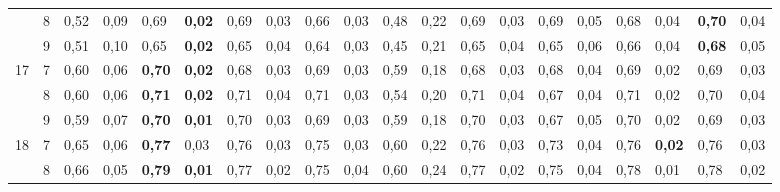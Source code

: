 \documentclass[conference]{IEEEtran}
\begin{document}
\begin{table}[]
\begin{tabular}{|cl|ll|ll|ll|ll|ll|ll|ll|ll|ll|}
		\multicolumn{1}{|c|}{} & 8 & \multicolumn{1}{l|}{0,52} & 0,09 & \multicolumn{1}{l|}{0,69} & \textbf{0,02} & \multicolumn{1}{l|}{0,69} & 0,03 & \multicolumn{1}{l|}{0,66} & 0,03 & \multicolumn{1}{l|}{0,48} & 0,22 & \multicolumn{1}{l|}{0,69} & 0,03 & \multicolumn{1}{l|}{0,69} & 0,05 & \multicolumn{1}{l|}{0,68} & 0,04 & \multicolumn{1}{l|}{\textbf{0,70}} & 0,04 \\ \cline{2-20} 
		\multicolumn{1}{|c|}{} & 9 & \multicolumn{1}{l|}{0,51} & 0,10 & \multicolumn{1}{l|}{0,65} & \textbf{0,02} & \multicolumn{1}{l|}{0,65} & 0,04 & \multicolumn{1}{l|}{0,64} & 0,03 & \multicolumn{1}{l|}{0,45} & 0,21 & \multicolumn{1}{l|}{0,65} & 0,04 & \multicolumn{1}{l|}{0,65} & 0,06 & \multicolumn{1}{l|}{0,66} & 0,04 & \multicolumn{1}{l|}{\textbf{0,68}} & 0,05 \\ \hline
		\multicolumn{1}{|c|}{\multirow{3}{*}{17}} & 7 & \multicolumn{1}{l|}{0,60} & 0,06 & \multicolumn{1}{l|}{\textbf{0,70}} & \textbf{0,02} & \multicolumn{1}{l|}{0,68} & 0,03 & \multicolumn{1}{l|}{0,69} & 0,03 & \multicolumn{1}{l|}{0,59} & 0,18 & \multicolumn{1}{l|}{0,68} & 0,03 & \multicolumn{1}{l|}{0,68} & 0,04 & \multicolumn{1}{l|}{0,69} & 0,02 & \multicolumn{1}{l|}{0,69} & 0,03 \\ \cline{2-20} 
		\multicolumn{1}{|c|}{} & 8 & \multicolumn{1}{l|}{0,60} & 0,06 & \multicolumn{1}{l|}{\textbf{0,71}} & \textbf{0,02} & \multicolumn{1}{l|}{0,71} & 0,04 & \multicolumn{1}{l|}{0,71} & 0,03 & \multicolumn{1}{l|}{0,54} & 0,20 & \multicolumn{1}{l|}{0,71} & 0,04 & \multicolumn{1}{l|}{0,67} & 0,04 & \multicolumn{1}{l|}{0,71} & 0,02 & \multicolumn{1}{l|}{0,70} & 0,04 \\ \cline{2-20} 
		\multicolumn{1}{|c|}{} & 9 & \multicolumn{1}{l|}{0,59} & 0,07 & \multicolumn{1}{l|}{\textbf{0,70}} & \textbf{0,01} & \multicolumn{1}{l|}{0,70} & 0,03 & \multicolumn{1}{l|}{0,69} & 0,03 & \multicolumn{1}{l|}{0,59} & 0,18 & \multicolumn{1}{l|}{0,70} & 0,03 & \multicolumn{1}{l|}{0,67} & 0,05 & \multicolumn{1}{l|}{0,70} & 0,02 & \multicolumn{1}{l|}{0,69} & 0,03 \\ \hline
		\multicolumn{1}{|c|}{\multirow{3}{*}{18}} & 7 & \multicolumn{1}{l|}{0,65} & 0,06 & \multicolumn{1}{l|}{\textbf{0,77}} & 0,03 & \multicolumn{1}{l|}{0,76} & 0,03 & \multicolumn{1}{l|}{0,75} & 0,03 & \multicolumn{1}{l|}{0,60} & 0,22 & \multicolumn{1}{l|}{0,76} & 0,03 & \multicolumn{1}{l|}{0,73} & 0,04 & \multicolumn{1}{l|}{0,76} & \textbf{0,02} & \multicolumn{1}{l|}{0,76} & 0,03 \\ \cline{2-20} 
		\multicolumn{1}{|c|}{} & 8 & \multicolumn{1}{l|}{0,66} & 0,05 & \multicolumn{1}{l|}{\textbf{0,79}} & \textbf{0,01} & \multicolumn{1}{l|}{0,77} & 0,02 & \multicolumn{1}{l|}{0,75} & 0,04 & \multicolumn{1}{l|}{0,60} & 0,24 & \multicolumn{1}{l|}{0,77} & 0,02 & \multicolumn{1}{l|}{0,75} & 0,04 & \multicolumn{1}{l|}{0,78} & 0,01 & \multicolumn{1}{l|}{0,78} & 0,02 \\ \cline{2-20} 

\end{tabular}
\end{table}
\end{document}
